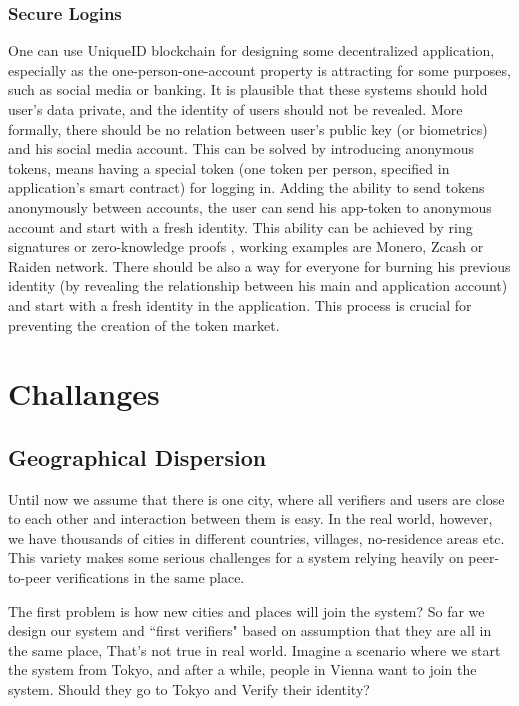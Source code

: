 \documentclass[conference]{IEEEtran}
\begin{document}
\subsubsection*{Secure Logins}
One can use UniqueID blockchain for designing some decentralized application, especially as the one-person-one-account property is attracting for some purposes, such as social media or banking. It is plausible that these systems should hold user's data private, and the identity of users should not be revealed. More formally, there should be no relation between user's public key (or biometrics) and his social media account. This can be solved by introducing anonymous tokens, means having a special token (one token per person, specified in application's smart contract) for logging in. Adding the ability to send tokens anonymously between accounts, the user can send his app-token to anonymous account and start with a fresh identity. This ability can be achieved by ring signatures \cite{RingSig} or zero-knowledge proofs \cite{ZeroKnowledge}, working examples are  Monero, Zcash or Raiden network. There should be also a way for everyone for burning his previous identity (by revealing the relationship between his main and application account) and start with a fresh identity in the application. This process is crucial for preventing the creation of the token market.



\section{Challanges}


\subsection{Geographical Dispersion}
Until now we assume that there is one city, where all verifiers and users are close to each other and interaction between them is easy. In the real world, however, we have thousands of cities in different countries, villages, no-residence areas etc. This variety makes some serious challenges for a system relying heavily on peer-to-peer verifications in the same place.


The first problem is how new cities and places will join the system? So far we design our system and ``first verifiers" based on assumption that they are all in the same place, That's not true in real world. Imagine a scenario where we start the system from Tokyo, and after a while, people in Vienna want to join the system. Should they go to Tokyo and Verify their identity?
\end{document}
